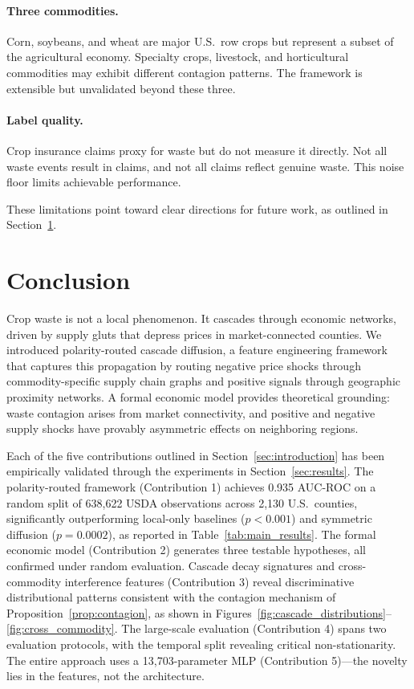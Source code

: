\documentclass[preprint,12pt,authoryear]{elsarticle}
\begin{document}
\paragraph{Three commodities.} Corn, soybeans, and wheat are major U.S.\ row crops but represent a subset of the agricultural economy. Specialty crops, livestock, and horticultural commodities may exhibit different contagion patterns. The framework is extensible but unvalidated beyond these three.

\paragraph{Label quality.} Crop insurance claims proxy for waste but do not measure it directly. Not all waste events result in claims, and not all claims reflect genuine waste. This noise floor limits achievable performance.

These limitations point toward clear directions for future work, as outlined in Section~\ref{sec:conclusion}.


\section{Conclusion}
\label{sec:conclusion}

Crop waste is not a local phenomenon. It cascades through economic networks, driven by supply gluts that depress prices in market-connected counties. We introduced polarity-routed cascade diffusion, a feature engineering framework that captures this propagation by routing negative price shocks through commodity-specific supply chain graphs and positive signals through geographic proximity networks. A formal economic model provides theoretical grounding: waste contagion arises from market connectivity, and positive and negative supply shocks have provably asymmetric effects on neighboring regions.

Each of the five contributions outlined in Section~\ref{sec:introduction} has been empirically validated through the experiments in Section~\ref{sec:results}. The polarity-routed framework (Contribution 1) achieves 0.935 AUC-ROC on a random split of 638,622 USDA observations across 2,130 U.S.\ counties, significantly outperforming local-only baselines ($p < 0.001$) and symmetric diffusion ($p = 0.0002$), as reported in Table~\ref{tab:main_results}. The formal economic model (Contribution 2) generates three testable hypotheses, all confirmed under random evaluation. Cascade decay signatures and cross-commodity interference features (Contribution 3) reveal discriminative distributional patterns consistent with the contagion mechanism of Proposition~\ref{prop:contagion}, as shown in Figures~\ref{fig:cascade_distributions}--\ref{fig:cross_commodity}. The large-scale evaluation (Contribution 4) spans two evaluation protocols, with the temporal split revealing critical non-stationarity. The entire approach uses a 13,703-parameter MLP (Contribution 5)---the novelty lies in the features, not the architecture.
\end{document}
